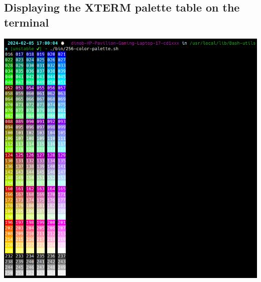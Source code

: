 \documentclass[a4paper,10pt]{article}
\begin{document}



    \newpage

    \color{sec2}
    \subsection{Displaying the XTERM palette table on the terminal}\color{text}

    \begin{justify}
    	\includegraphics[scale=0.5884]{../../00 DATA/img/XTERM palette table.png}
    \end{justify}




\end{document}
